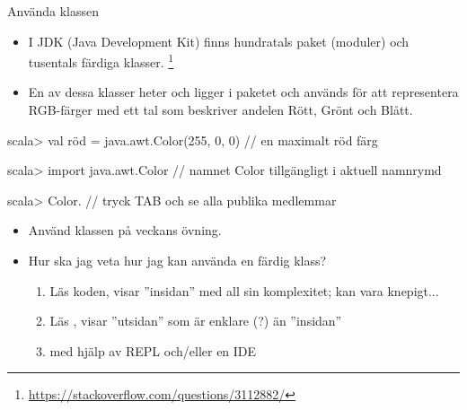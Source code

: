 \begin{Slide}{Använda klassen }\SlideFontSmall
\begin{itemize}
\item I JDK (Java Development Kit) finns hundratals paket (moduler) och tusentals färdiga klasser.
\footnote{\SlideFontTiny\url{https://stackoverflow.com/questions/3112882/}}

\item En av dessa klasser heter  och ligger i paketet  och används för att representera RGB-färger med ett tal som beskriver andelen Rött, Grönt och Blått.
\end{itemize}
\begin{REPL}
scala> val röd = java.awt.Color(255, 0, 0)    //  en maximalt röd färg

scala> import java.awt.Color  // namnet Color tillgängligt i aktuell namnrymd

scala> Color.    // tryck TAB och se alla publika medlemmar
\end{REPL}
\pause
\begin{itemize}
\item Använd klassen  på veckans övning.
\item Hur ska jag veta hur jag kan använda en färdig klass?
\pause
\begin{enumerate}\SlideFontTiny
  \item Läs koden, visar ''insidan'' med all sin komplexitet; kan vara knepigt...
  \item Läs , visar ''utsidan'' som är enklare (?) än ''insidan''
  \item {} med hjälp av REPL och/eller en IDE
\end{enumerate}
\end{itemize}

\end{Slide}



